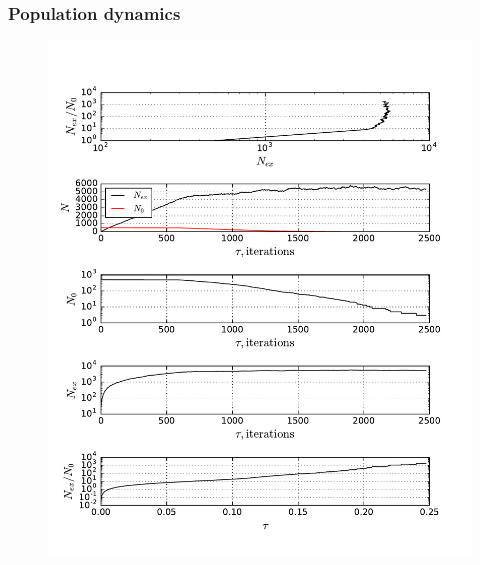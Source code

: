 \documentclass{beamer}
\begin{document}
\begin{frame}
\frametitle{Population dynamics}
\begin{figure}[ht!]		
\centering
\includegraphics[scale=0.30]{deathN0}
\caption{ }
\label{fig:thomEG}
\end{figure}
\end{frame}
\end{document}
